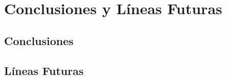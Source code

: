\chapter{Conclusiones y Líneas Futuras}
\label{cap:conclusiones}

\section{Conclusiones}
\label{sec:conclusiones:conclusiones}

\section{Líneas Futuras}
\label{sec:conclusiones:futuro} 